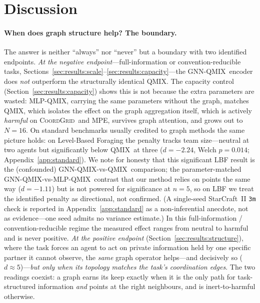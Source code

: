 \documentclass[manuscript, screen, review]{jair}
\newcommand{\algoname}[1]{\textsc{#1}}
\newcommand{\qmix}{\algoname{QMIX}}
\newcommand{\gnnqmix}{\algoname{GNN-QMIX}}
\newcommand{\coordgrid}{\textsc{CoordGrid}}
\newcommand{\mlpqmix}{\algoname{MLP-QMIX}}
\begin{document}
\section{Discussion}
\label{sec:discussion}

\paragraph{When does graph structure help? The boundary.} The answer is
neither ``always'' nor ``never'' but a boundary with two identified
endpoints. \emph{At the negative endpoint}---full-information or
convention-reducible tasks, Sections~\ref{sec:results:scale}--\ref{sec:results:capacity}---the
\gnnqmix\ encoder does \emph{not} outperform the structurally identical
\qmix. The capacity control (Section~\ref{sec:results:capacity}) shows this
is not because the extra parameters are wasted: \mlpqmix, carrying the same
parameters without the graph, matches \qmix, which isolates the effect on the
graph aggregation itself, which is actively \emph{harmful} on \coordgrid\ and
MPE, survives graph attention, and grows out to $N{=}16$. On standard
benchmarks usually credited to graph methods the same picture holds: on
Level-Based Foraging the penalty tracks team size---neutral at two agents but
significantly below \qmix\ at three ($d=-2.24$, Welch $p=0.014$;
Appendix~\ref{app:standard}). We note for honesty that this significant LBF
result is the (confounded) \gnnqmix-vs-\qmix\ comparison; the parameter-matched
\gnnqmix-vs-\mlpqmix\ contrast that our method relies on points the same way
($d=-1.11$) but is not powered for significance at $n{=}5$, so on LBF we treat
the identified penalty as directional, not confirmed. (A single-seed StarCraft~II \texttt{3m} check
is reported in Appendix~\ref{app:standard} as a non-inferential anecdote, not
as evidence---one seed admits no variance estimate.) In this
full-information / convention-reducible regime the measured effect ranges from
neutral to harmful and is never positive.
\emph{At the positive endpoint} (Section~\ref{sec:results:structure}), where
the task forces an agent to act on private information held by one specific
partner it cannot observe, the \emph{same} graph operator helps---and
decisively so ($d\approx5$)---\emph{but only when its topology matches the
task's coordination edges}. The two readings coexist: a graph earns its keep
exactly when it is the only path for task-structured information \emph{and}
points at the right neighbours, and is inert-to-harmful otherwise.
\end{document}
